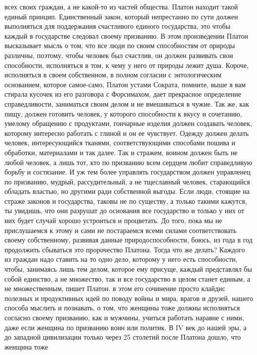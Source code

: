 всех своих граждан, а не какой-то из частей общества. Платон находит такой
единый принцип. Единственный закон, который непрестанно по сути должен
выполняться для поддержания счастливого единого государства, это чтобы каждый в
государстве следовал своему призванию. В этом произведении Платон высказывает
мысль о том, что все люди по своим способностям от природы различны, поэтому,
чтобы человек был счастлив, он должен развивать свои способности, исполняться в
том, к чему у него от природы лежит душа. Короче, исполняться в своем
собственном, в полном согласии с энтологическим основанием, которое самое-само,
Платон устами Сократа, помните, выше я вам стирала кусочек из его разговора с
Форсимахом, дает прекрасное определение справедливости, заниматься своим делом и
не вмешиваться в чужие. Так же, как пищу, должен готовить человек, у которого
способности к вкусу и сочетанию, умелому обращению с продуктами, гончарные
изделия должен создавать человек, которому интересно работать с глиной и он ее
чувствует. Одежду должен делать человек, интересующийся тканями,
соответствующими способами пошива и обработки, материалами и так далее. Так и
стражем, воином должен быть не любой человек, а лишь тот, кто по призванию всем
сердцем любит справедливую борьбу и состязание. И уж тем более управлять
государством должен управленец по призванию, мудрый, рассудительный, а не
тщеславный человек, старающийся обладать властью, но другими ради собственной
выгоды. Если люди, стоящие на страже законов и государства, таковы не по
существу, а только такими кажутся, ты увидишь, что они разрушат до основания все
государство и только у них от них будет случай хорошо устроиться и процветать.
До того, пока мы не прислушаемся к этому и сами не постараемся всеми силами
соответствовать своему собственному, развивая данные природоспособности, боюсь,
из года в год продолжить сбываться это пророчество Платона. Тогда что же делать?
Каждого из граждан надо ставить на то одно дело, которому у него есть
способности, чтобы, занимаясь лишь тем делом, которое ему присуще, каждый
представлял бы собой единство, а не множество, так и все государство в целом
станет единым, а не множественным, пишет Платон. в этом его сочинение просто
клайдис полезных и продуктивных идей по поводу войны и мира, врагов и друзей,
нашего способа мыслить и познавать, о том, что женщины тоже должны исполняться
согласно своему призванию, как и мужчины, учиться работать наравне с ними, даже
если женщина по призванию воин или политик. В IV век до нашей эры, а до западной
цивилизации только через 25 столетий после Платона дошло, что женщина тоже
